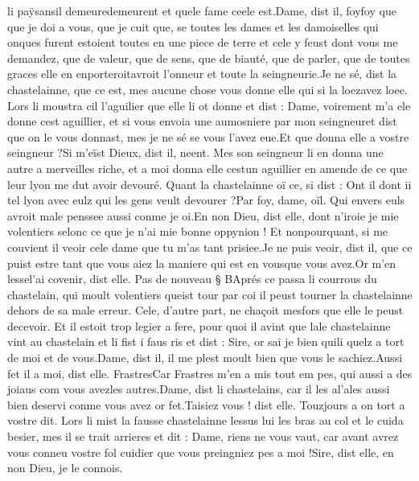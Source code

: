 \documentclass{article}
\begin{document}
\begin{pages}
      li paÿsansil 
      demeuredemeurent et quele fame 
      ceele est.Dame, dist il, foyfoy que que je 
      doi a vous, que je cuit que, 
   se toutes les dames et les damoiselles qui onques furent estoient toutes en une piece de terre et cele y feust dont vous 
      me demandez, que de valeur, que de sens, que de biauté, que de parler, 
      que de toutes graces elle en enporteroitavroit l’onneur 
      et toute la seingneurie.Je ne sé, dist la chastelainne, 
      que ce est, mes aucune chose vous donne elle qui si la loezavez loee.
   Lors li moustra cil l’aguilier que elle li ot donne et dist :
   Dame, voirement m’a ele donne cest aguillier, et si vous envoia une aumosniere 
      par 
         mon seingneuret dist que on le vous donnast, 
      mes je ne sé se vous l’avez eue.Et que donna elle a vostre seingneur ?Si m’eïst Dieux, dist il, neent. Mes son seingneur 
      li en donna une autre a merveilles riche, et a moi donna elle cestun 
      aguillier en amende de ce que leur lyon me dut avoir devouré. \pend
\pstart Quant la chastelainne oï ce, si dist :
   Ont il dont ii tel 
      lyon avec eulz qui les gens veult devourer ?Par foy, dame, oïl. Qui envers euls avroit male penssee aussi conme je oi.En non Dieu, dist elle, dont n’iroie je mie volentiers selonc ce que je n’ai mie bonne oppynion ! 
   Et nonpourquant, si me couvient il veoir cele dame que tu m’as tant prisiee.Je ne puis veoir, dist il, que ce puist estre tant que vous aiez la maniere 
      qui est en vousque vous avez.Or m’en lessel'ai covenir, dist elle. \pend
\pstart Pas de nouveau § BAprés ce passa li courrous du 
   chastelain, 
   qui moult volentiers queist tour par coi il peust tourner la chastelainne 
   dehors de sa male erreur. 
   Cele, d’autre part, ne chaçoit mesfors que elle le peust decevoir. 
   Et il estoit trop legier a fere, pour quoi il avint que 
   lale chastelainne vint au 
   chastelain et li fist i faus ris et dist :
   Sire, or sai je bien quili quelz a tort 
      de moi et de vous.Dame, dist il, il me plest moult bien que vous le sachiez.Aussi fet il a moi, dist elle. 
      FrastresCar Frastres m’en a mis 
      tout em pes, qui aussi a des joiaus com 
      vous avezles autres.Dame, dist li chastelains, 
      car il les al'ales  
      aussi bien deservi conme vous avez or fet.Taisiez vous ! dist elle. 
      Touzjours a on tort a vostre dit.
   Lors li mist la fausse chastelainne 
   lessus lui les bras au col et le cuida besier, 
   mes il se trait arrieres et dit :
   Dame, riens ne vous vaut, 
      car avant avrez vous conneu vostre fol cuidier que vous preingniez pes a moi !Sire, dist elle, en non Dieu, je le connois. 

\end{pages}
\end{document}
